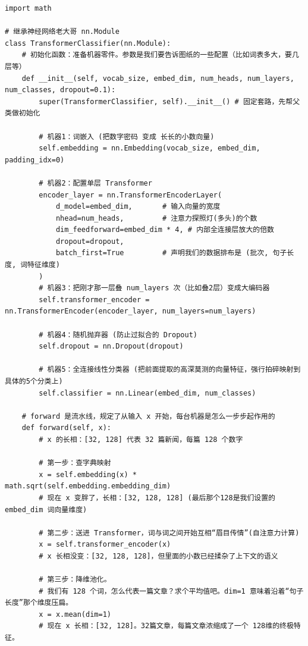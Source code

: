 \documentclass[10pt]{article}
\numberwithin{equation}{section}
\theoremstyle{plain}
\theoremstyle{definition}
\theoremstyle{remark}
\begin{document}
\begin{CodeBox}
	\begin{lstlisting}[style=PythonStyle]
import math

# 继承神经网络老大哥 nn.Module
class TransformerClassifier(nn.Module):
    # 初始化函数：准备机器零件。参数是我们要告诉图纸的一些配置（比如词表多大，要几层等）
    def __init__(self, vocab_size, embed_dim, num_heads, num_layers, num_classes, dropout=0.1):
        super(TransformerClassifier, self).__init__() # 固定套路，先帮父类做初始化
        
        # 机器1：词嵌入 (把数字密码 变成 长长的小数向量)
        self.embedding = nn.Embedding(vocab_size, embed_dim, padding_idx=0)
        
        # 机器2：配置单层 Transformer
        encoder_layer = nn.TransformerEncoderLayer(
            d_model=embed_dim,       # 输入向量的宽度
            nhead=num_heads,         # 注意力探照灯(多头)的个数
            dim_feedforward=embed_dim * 4, # 内部全连接层放大的倍数
            dropout=dropout,
            batch_first=True         # 声明我们的数据排布是 (批次, 句子长度, 词特征维度)
        )
        # 机器3：把刚才那一层叠 num_layers 次（比如叠2层）变成大编码器
        self.transformer_encoder = nn.TransformerEncoder(encoder_layer, num_layers=num_layers)
        
        # 机器4：随机抛弃器 (防止过拟合的 Dropout)
        self.dropout = nn.Dropout(dropout)
        
        # 机器5：全连接线性分类器 (把前面提取的高深莫测的向量特征，强行拍碎映射到具体的5个分类上)
        self.classifier = nn.Linear(embed_dim, num_classes)
        
    # forward 是流水线，规定了从输入 x 开始，每台机器是怎么一步步起作用的
    def forward(self, x):
        # x 的长相：[32, 128] 代表 32 篇新闻，每篇 128 个数字
        
        # 第一步：查字典映射
        x = self.embedding(x) * math.sqrt(self.embedding.embedding_dim)
        # 现在 x 变胖了，长相：[32, 128, 128] (最后那个128是我们设置的 embed_dim 词向量维度)
        
        # 第二步：送进 Transformer，词与词之间开始互相“眉目传情”(自注意力计算)
        x = self.transformer_encoder(x)
        # x 长相没变：[32, 128, 128]，但里面的小数已经揉杂了上下文的语义
        
        # 第三步：降维池化。
        # 我们有 128 个词，怎么代表一篇文章？求个平均值吧。dim=1 意味着沿着“句子长度”那个维度压扁。
        x = x.mean(dim=1)
        # 现在 x 长相：[32, 128]。32篇文章，每篇文章浓缩成了一个 128维的终极特征。
        

\end{lstlisting}
\end{CodeBox}
\end{document}
